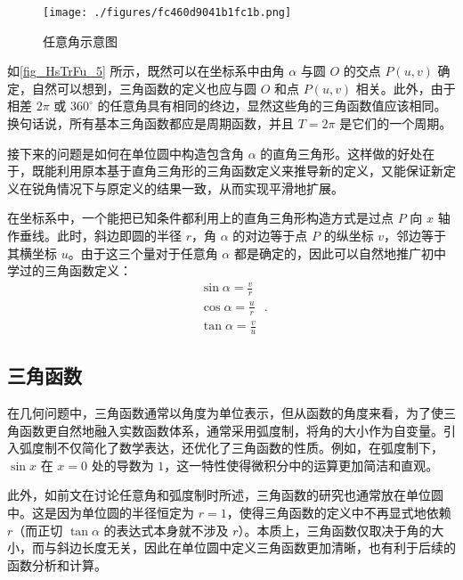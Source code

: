 \begin{figure}[ht]
\centering
\texttt{[image: ./figures/fc460d9041b1fc1b.png]}
\caption{任意角示意图} \label{fig_HsTrFu_5}
\end{figure}

如\autoref{fig_HsTrFu_5} 所示，既然可以在坐标系中由角 $\alpha$ 与圆 $O$ 的交点 $P(u,v)$ 确定，自然可以想到，三角函数的定义也应与圆 $O$ 和点 $P(u,v)$ 相关。此外，由于相差 $2\pi$ 或 $360^\circ$ 的任意角具有相同的终边，显然这些角的三角函数值应该相同。换句话说，所有基本三角函数都应是周期函数，并且 $T=2\pi$ 是它们的一个周期。

接下来的问题是如何在单位圆中构造包含角 $\alpha$ 的直角三角形。这样做的好处在于，既能利用原本基于直角三角形的三角函数定义来推导新的定义，又能保证新定义在锐角情况下与原定义的结果一致，从而实现平滑地扩展。

在坐标系中，一个能把已知条件都利用上的直角三角形构造方式是过点 $P$ 向 $x$ 轴作垂线。此时，斜边即圆的半径 $r$，角 $\alpha$ 的对边等于点 $P$ 的纵坐标 $v$，邻边等于其横坐标 $u$。由于这三个量对于任意角 $\alpha$ 都是确定的，因此可以自然地推广初中学过的三角函数定义：
\begin{equation}
\begin{array}{c} 
\displaystyle\sin\alpha = \frac{v}{r}\\
\displaystyle\cos\alpha = \frac{u}{r}\\
\displaystyle\tan\alpha = \frac{v}{u}
\end{array}~.
\end{equation}



\subsection{三角函数}

在几何问题中，三角函数通常以角度为单位表示，但从函数的角度来看，为了使三角函数更自然地融入实数函数体系，通常采用弧度制，将角的大小作为自变量。引入弧度制不仅简化了数学表达，还优化了三角函数的性质。例如，在弧度制下，$\sin x$ 在 $x=0$ 处的导数为 $1$，这一特性使得微积分中的运算更加简洁和直观。

此外，如前文在讨论任意角和弧度制时所述，三角函数的研究也通常放在单位圆中。这是因为单位圆的半径恒定为 $r=1$，使得三角函数的定义中不再显式地依赖 $r$（而正切 $\tan\alpha$ 的表达式本身就不涉及 $r$）。本质上，三角函数仅取决于角的大小，而与斜边长度无关，因此在单位圆中定义三角函数更加清晰，也有利于后续的函数分析和计算。

